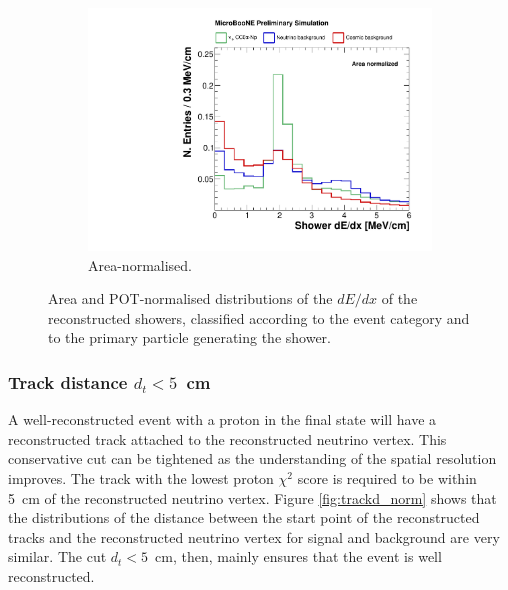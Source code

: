 \begin{figure}[htbp]
\begin{subfigure}{0.49\textwidth}
    \includegraphics[width=\linewidth]{figures/h_shower_dedx_cali_norm.pdf}
    \caption{Area-normalised.} \label{fig:dedx_norm}
  \end{subfigure}
  \caption{Area and POT-normalised distributions of the $dE/dx$ of the reconstructed showers, classified according to the event category and to the primary particle generating the shower.}\label{fig:dedx_datamc}
\end{figure}

\subsubsection*{Track distance $d_{t} < 5$~cm}
A well-reconstructed event with a proton in the final state will have a reconstructed track attached to the reconstructed neutrino vertex. This conservative cut can be tightened as the understanding of the spatial resolution improves. The track with the lowest proton $\chi^2$ score is required to be within 5~cm of the reconstructed neutrino vertex.
Figure \ref{fig:trackd_norm} shows that the distributions of the distance between the start point of the reconstructed tracks and the reconstructed neutrino vertex for signal and background are very similar. The cut $d_{t} < 5$~cm, then, mainly ensures that the event is well reconstructed. 

